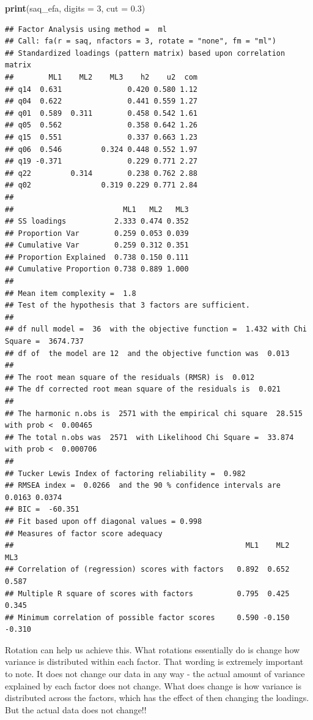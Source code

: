 \documentclass[
]{book}
\newenvironment{Shaded}{\begin{snugshade}}{\end{snugshade}}
\newcommand{\AttributeTok}[1]{\textcolor[rgb]{0.13,0.29,0.53}{#1}}
\newcommand{\DecValTok}[1]{\textcolor[rgb]{0.00,0.00,0.81}{#1}}
\newcommand{\FloatTok}[1]{\textcolor[rgb]{0.00,0.00,0.81}{#1}}
\newcommand{\FunctionTok}[1]{\textcolor[rgb]{0.13,0.29,0.53}{\textbf{#1}}}
\newcommand{\NormalTok}[1]{#1}
\begin{document}
\begin{Shaded}
\begin{Highlighting}[]
\FunctionTok{print}\NormalTok{(saq\_efa, }\AttributeTok{digits =} \DecValTok{3}\NormalTok{, }\AttributeTok{cut =} \FloatTok{0.3}\NormalTok{)}
\end{Highlighting}
\end{Shaded}

\begin{verbatim}
## Factor Analysis using method =  ml
## Call: fa(r = saq, nfactors = 3, rotate = "none", fm = "ml")
## Standardized loadings (pattern matrix) based upon correlation matrix
##        ML1    ML2    ML3    h2    u2  com
## q14  0.631               0.420 0.580 1.12
## q04  0.622               0.441 0.559 1.27
## q01  0.589  0.311        0.458 0.542 1.61
## q05  0.562               0.358 0.642 1.26
## q15  0.551               0.337 0.663 1.23
## q06  0.546         0.324 0.448 0.552 1.97
## q19 -0.371               0.229 0.771 2.27
## q22         0.314        0.238 0.762 2.88
## q02                0.319 0.229 0.771 2.84
## 
##                         ML1   ML2   ML3
## SS loadings           2.333 0.474 0.352
## Proportion Var        0.259 0.053 0.039
## Cumulative Var        0.259 0.312 0.351
## Proportion Explained  0.738 0.150 0.111
## Cumulative Proportion 0.738 0.889 1.000
## 
## Mean item complexity =  1.8
## Test of the hypothesis that 3 factors are sufficient.
## 
## df null model =  36  with the objective function =  1.432 with Chi Square =  3674.737
## df of  the model are 12  and the objective function was  0.013 
## 
## The root mean square of the residuals (RMSR) is  0.012 
## The df corrected root mean square of the residuals is  0.021 
## 
## The harmonic n.obs is  2571 with the empirical chi square  28.515  with prob <  0.00465 
## The total n.obs was  2571  with Likelihood Chi Square =  33.874  with prob <  0.000706 
## 
## Tucker Lewis Index of factoring reliability =  0.982
## RMSEA index =  0.0266  and the 90 % confidence intervals are  0.0163 0.0374
## BIC =  -60.351
## Fit based upon off diagonal values = 0.998
## Measures of factor score adequacy             
##                                                     ML1    ML2    ML3
## Correlation of (regression) scores with factors   0.892  0.652  0.587
## Multiple R square of scores with factors          0.795  0.425  0.345
## Minimum correlation of possible factor scores     0.590 -0.150 -0.310
\end{verbatim}

Rotation can help us achieve this. What rotations essentially do is change how variance is distributed within each factor. That wording is extremely important to note. It does not change our data in any way - the actual amount of variance explained by each factor does not change. What does change is how variance is distributed across the factors, which has the effect of then changing the loadings. But the actual data does not change!!
\end{document}
